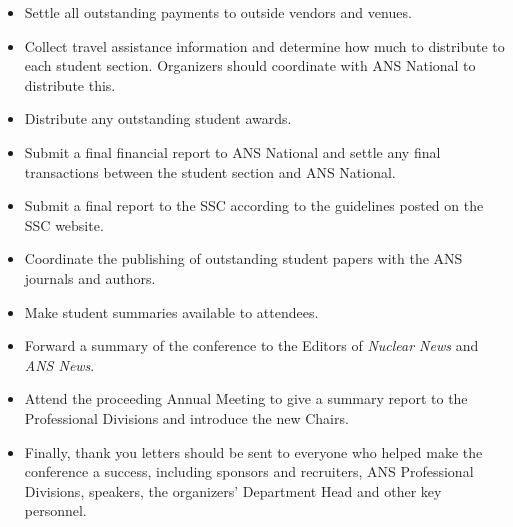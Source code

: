 \documentclass[12pt]{article}
\begin{document}
\begin{itemize}
    \item Settle all outstanding payments to outside vendors and venues.
    \item Collect travel assistance information and determine how much to distribute to each student section. Organizers should coordinate with ANS National to distribute this.
    \item Distribute any outstanding student awards.
    \item Submit a final financial report to ANS National and settle any final transactions between the student section and ANS National.
    \item Submit a final report to the SSC according to the guidelines posted on the SSC website.
    \item Coordinate the publishing of outstanding student papers with the ANS journals and authors.
    \item Make student summaries available to attendees.
    \item Forward a summary of the conference to the Editors of \textit{Nuclear News} and \textit{ANS News}.
    \item Attend the proceeding Annual Meeting to give a summary report to the Professional Divisions and introduce the new Chairs.
    \item Finally, thank you letters should be sent to everyone who helped make the conference a success, including sponsors and recruiters, ANS Professional Divisions, speakers, the organizers' Department Head and other key personnel.
\end{itemize}
\end{document}
